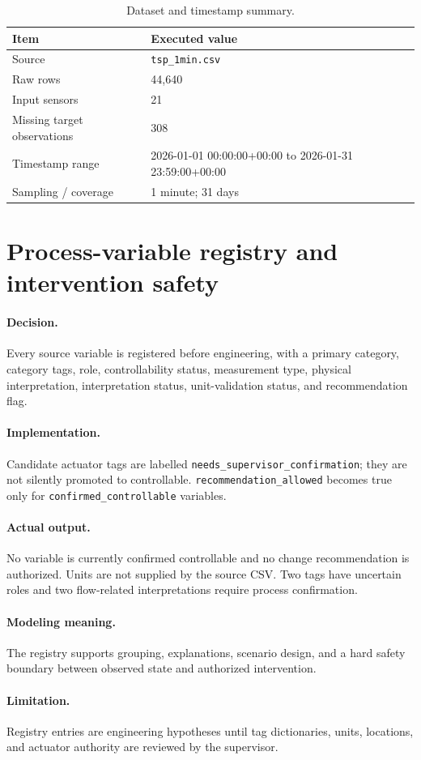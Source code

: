 \documentclass[10pt,a4paper]{article}
\newcommand{\decision}{\paragraph{Decision.}}
\newcommand{\implementation}{\paragraph{Implementation.}}
\newcommand{\actual}{\paragraph{Actual output.}}
\newcommand{\modelmeaning}{\paragraph{Modeling meaning.}}
\newcommand{\limitation}{\paragraph{Limitation.}}
\begin{document}
\begin{table}[H]
\centering
\small
\begin{tabular}{p{}p{}}
\toprule
Item & Executed value \\
\midrule
Source & \nolinkurl{tsp_1min.csv} \\
Raw rows & 44,640 \\
Input sensors & 21 \\
Missing target observations & 308 \\
Timestamp range & 2026-01-01 00:00:00+00:00 to 2026-01-31 23:59:00+00:00 \\
Sampling / coverage & 1 minute; 31 days \\
\bottomrule
\end{tabular}
\caption{Dataset and timestamp summary.}\label{tab:dataset}
\end{table}


\section{Process-variable registry and intervention safety}
\decision Every source variable is registered before engineering, with a primary category, category tags, role, controllability status, measurement type, physical interpretation, interpretation status, unit-validation status, and recommendation flag.
\implementation Candidate actuator tags are labelled \texttt{needs\_supervisor\_confirmation}; they are not silently promoted to controllable. \texttt{recommendation\_allowed} becomes true only for \texttt{confirmed\_controllable} variables.
\actual No variable is currently confirmed controllable and no change recommendation is authorized. Units are not supplied by the source CSV. Two tags have uncertain roles and two flow-related interpretations require process confirmation.
\modelmeaning The registry supports grouping, explanations, scenario design, and a hard safety boundary between observed state and authorized intervention.
\limitation Registry entries are engineering hypotheses until tag dictionaries, units, locations, and actuator authority are reviewed by the supervisor.
\end{document}
